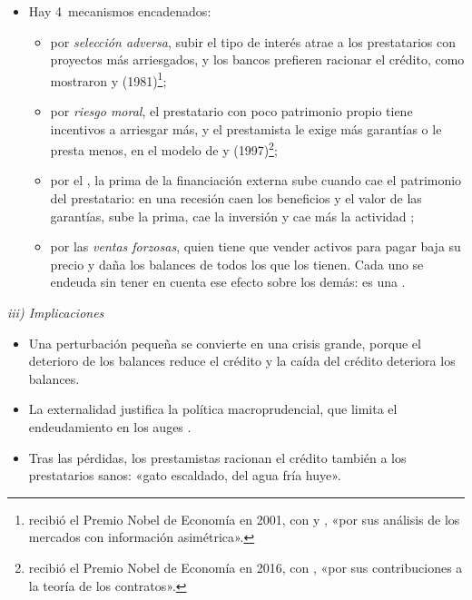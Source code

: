 \documentclass[11pt]{article}
\begin{document}
\begin{itemize}
\item Hay 4~mecanismos encadenados:
  \begin{itemize}
  \item por \emph{selección adversa}, subir el tipo de interés atrae a los prestatarios con proyectos más arriesgados, y los bancos prefieren racionar el crédito, como mostraron  y  (1981)\nocite{StiglitzWeiss1981Credit}\footnote{ recibió el Premio Nobel de Economía en 2001, con  y , «por sus análisis de los mercados con información asimétrica»\nocite{Nobel2001AkerlofSpenceStiglitz}.};
  \item por \emph{riesgo moral}, el prestatario con poco patrimonio propio tiene incentivos a arriesgar más, y el prestamista le exige más garantías o le presta menos, en el modelo de  y  (1997)\nocite{HolmstromTirole1997Financial}\footnote{ recibió el Premio Nobel de Economía en 2016, con , «por sus contribuciones a la teoría de los contratos»\nocite{Nobel2016HartHolmstrom}.};
  \item por el , la prima de la financiación externa sube cuando cae el patrimonio del prestatario: en una recesión caen los beneficios y el valor de las garantías, sube la prima, cae la inversión y cae más la actividad\nocite{BernankeGertler1989Agency,BernankeGertlerGilchrist1999}  ;
  \item por las \emph{ventas forzosas}, quien tiene que vender activos para pagar baja su precio y daña los balances de todos los que los tienen. Cada uno se endeuda sin tener en cuenta ese efecto sobre los demás: es una \nocite{Korinek2011New} .
  \end{itemize}
\end{itemize}

\hspace*{3.6em}\emph{iii) Implicaciones}

\begin{itemize}
  \item Una perturbación pequeña se convierte en una crisis grande, porque el deterioro de los balances reduce el crédito y la caída del crédito deteriora los balances.
  \item La externalidad justifica la política macroprudencial, que limita el endeudamiento en los auges .
  \item Tras las pérdidas, los prestamistas racionan el crédito también a los prestatarios sanos: «gato escaldado, del agua fría huye».
\end{itemize}
\end{document}
